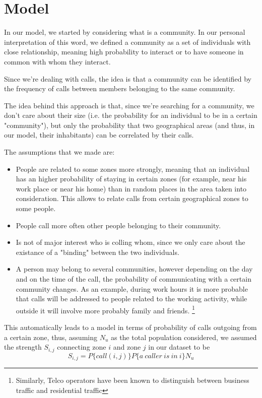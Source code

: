 \section{Model}
In our model, we started by considering what is a community. In our personal interpretation of this word,
we defined a community as a set of individuals with close relationship, meaning high probability to interact or to have someone in common with whom they interact.

Since we're dealing with calls, the idea is that a community can be identified by the frequency of calls between members belonging
to the same community.

The idea behind this approach is that, since we're searching for a community, we don't care about their size (i.e. the probability for an individual to be in a certain "community"), 
but only the probability that two geographical areas (and thus, in our model, their inhabitants) can be correlated by their calls.

The assumptions that we made are:
\begin{itemize}
\item People are related to some zones more strongly, meaning that an individual 
has an higher probability of staying in certain zones (for example, near his work place or near his home) than in random places
in the area taken into consideration. This allows to relate calls from certain geographical zones to some people.
\item People call more often other people belonging to their community.
\item Is not of major interest who is colling whom, since we only care about the existance of a "binding" between the two individuals.
\item A person may belong to several communities, however depending on the day and on the time of the call, the probability of communicating with a certain community changes.
As an example, during work hours it is more probable that calls will be addressed to people related to the working activity, while outside it will involve more probably family and friends.
\footnote{Similarly, Telco operators have been known to distinguish between business traffic and residential traffic} 
\end{itemize}

This automatically leads to a model in terms of probability of calls outgoing from a certain zone, thus, assuming $N_{u}$ as the total population considered, we assumed the strength $S_{i,j}$ connecting
zone $i$ and zone $j$ in our dataset to be
$$
S_{i,j}  = P\{call(i,j)\} P\{a\ caller\ is\ in\ i\} N_{u}
$$

